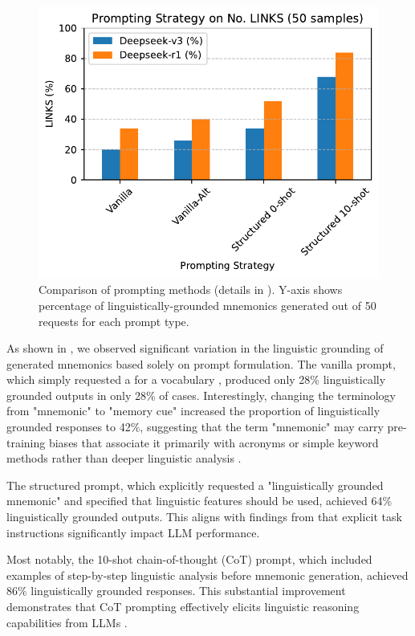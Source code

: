 \begin{figure}[htb]
  \centering
  \includegraphics[width=\linewidth]{figures/prompt_comparison.pdf}
  \caption{Comparison of prompting methods (details in ). Y-axis shows percentage of linguistically-grounded mnemonics generated out of 50 requests for each prompt type.}
  \label{fig:prompting-methods}
\end{figure}

As shown in , we observed significant variation in the linguistic grounding of generated mnemonics based solely on prompt formulation. The vanilla prompt, which simply requested a \lgm for a vocabulary \vocab, produced only 28\% linguistically grounded outputs in only 28\% of cases. Interestingly, changing the terminology from "mnemonic" to "memory cue" increased the proportion of linguistically grounded responses to 42\%, suggesting that the term "mnemonic" may carry pre-training biases that associate it primarily with acronyms or simple keyword methods rather than deeper linguistic analysis \citep{hackmannWordImportanceExplains2024}.

The structured prompt, which explicitly requested a "linguistically grounded mnemonic" and specified that linguistic features should be used, achieved 64\% linguistically grounded outputs. This aligns with findings from \citet{yinDidYouRead2023} that explicit task instructions significantly impact LLM performance.

Most notably, the 10-shot chain-of-thought (CoT) prompt, which included examples of step-by-step linguistic analysis before mnemonic generation, achieved 86\% linguistically grounded responses. This substantial improvement demonstrates that CoT prompting effectively elicits linguistic reasoning capabilities from LLMs \citep{weiChainofThoughtPromptingElicits2022}.

